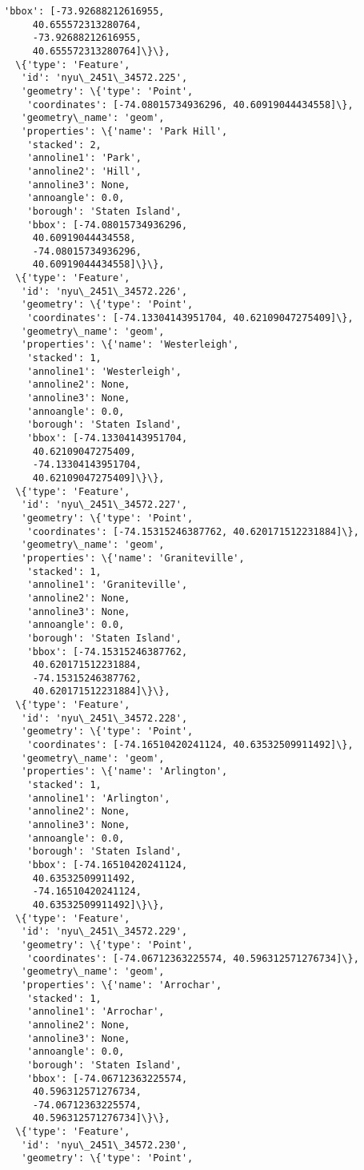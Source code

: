 \documentclass[11pt]{article}
\begin{document}
\begin{tcolorbox}[breakable, size=fbox, boxrule=.5pt, pad at break*=1mm, opacityfill=0]
\begin{Verbatim}[commandchars=\\\{\}]
    'bbox': [-73.92688212616955,
     40.655572313280764,
     -73.92688212616955,
     40.655572313280764]\}\},
  \{'type': 'Feature',
   'id': 'nyu\_2451\_34572.225',
   'geometry': \{'type': 'Point',
    'coordinates': [-74.08015734936296, 40.60919044434558]\},
   'geometry\_name': 'geom',
   'properties': \{'name': 'Park Hill',
    'stacked': 2,
    'annoline1': 'Park',
    'annoline2': 'Hill',
    'annoline3': None,
    'annoangle': 0.0,
    'borough': 'Staten Island',
    'bbox': [-74.08015734936296,
     40.60919044434558,
     -74.08015734936296,
     40.60919044434558]\}\},
  \{'type': 'Feature',
   'id': 'nyu\_2451\_34572.226',
   'geometry': \{'type': 'Point',
    'coordinates': [-74.13304143951704, 40.62109047275409]\},
   'geometry\_name': 'geom',
   'properties': \{'name': 'Westerleigh',
    'stacked': 1,
    'annoline1': 'Westerleigh',
    'annoline2': None,
    'annoline3': None,
    'annoangle': 0.0,
    'borough': 'Staten Island',
    'bbox': [-74.13304143951704,
     40.62109047275409,
     -74.13304143951704,
     40.62109047275409]\}\},
  \{'type': 'Feature',
   'id': 'nyu\_2451\_34572.227',
   'geometry': \{'type': 'Point',
    'coordinates': [-74.15315246387762, 40.620171512231884]\},
   'geometry\_name': 'geom',
   'properties': \{'name': 'Graniteville',
    'stacked': 1,
    'annoline1': 'Graniteville',
    'annoline2': None,
    'annoline3': None,
    'annoangle': 0.0,
    'borough': 'Staten Island',
    'bbox': [-74.15315246387762,
     40.620171512231884,
     -74.15315246387762,
     40.620171512231884]\}\},
  \{'type': 'Feature',
   'id': 'nyu\_2451\_34572.228',
   'geometry': \{'type': 'Point',
    'coordinates': [-74.16510420241124, 40.63532509911492]\},
   'geometry\_name': 'geom',
   'properties': \{'name': 'Arlington',
    'stacked': 1,
    'annoline1': 'Arlington',
    'annoline2': None,
    'annoline3': None,
    'annoangle': 0.0,
    'borough': 'Staten Island',
    'bbox': [-74.16510420241124,
     40.63532509911492,
     -74.16510420241124,
     40.63532509911492]\}\},
  \{'type': 'Feature',
   'id': 'nyu\_2451\_34572.229',
   'geometry': \{'type': 'Point',
    'coordinates': [-74.06712363225574, 40.596312571276734]\},
   'geometry\_name': 'geom',
   'properties': \{'name': 'Arrochar',
    'stacked': 1,
    'annoline1': 'Arrochar',
    'annoline2': None,
    'annoline3': None,
    'annoangle': 0.0,
    'borough': 'Staten Island',
    'bbox': [-74.06712363225574,
     40.596312571276734,
     -74.06712363225574,
     40.596312571276734]\}\},
  \{'type': 'Feature',
   'id': 'nyu\_2451\_34572.230',
   'geometry': \{'type': 'Point',

\end{Verbatim}
\end{tcolorbox}
\end{document}
